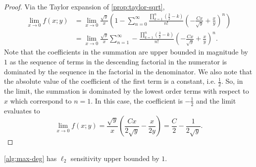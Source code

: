 \begin{proof}
Via the Taylor expansion of \cref{prop:taylor-sqrt},
\begin{align*}
    \lim_{x \to 0} f(x;y) &= \lim_{x \to 0} \frac{\sqrt{y}}{x} \left(1 - \sum_{n=0}^\infty \frac{\prod_{k=1}^n \left(\frac{3}{2} - k\right)}{n!} \left(-\frac{Cx}{\sqrt{y}} + \frac{x}{y}\right)^n \right)\\
    &= \lim_{x \to 0} \frac{\sqrt{y}}{x} \sum_{n=1}^\infty - \frac{\prod_{k=1}^n \left(\frac{3}{2} - k\right)}{n!} \left(-\frac{Cx}{\sqrt{y}} + \frac{x}{y}\right)^n.
\end{align*}
Note that the coefficients in the summation are upper bounded in magnitude by $1$ as the sequence of terms in the descending factorial in the numerator is dominated by the sequence in the factorial in the denominator.
We also note that the absolute value of the coefficient of the first term is a constant, i.e. $\frac{1}{2}$.
So, in the limit, the summation is dominated by the lowest order terms with respect to $x$ which correspond to $n=1$. In this case, the coefficient is $-\frac{1}{2}$ and the limit evaluates to
\begin{equation*}
    \lim_{x \to 0} f(x;y) = \frac{\sqrt{y}}{{x}} \left(\frac{Cx}{2\sqrt{y}} - \frac{x}{2y}\right) = \frac{C}{2} - \frac{1}{2\sqrt{y}}.
\end{equation*}
\end{proof}

\begin{lemma}\label{lem:l2-sensitivity-biased-weights}
\cref{alg:max-deg} has $\ell_2$ sensitivity upper bounded by $1$.
\end{lemma}


